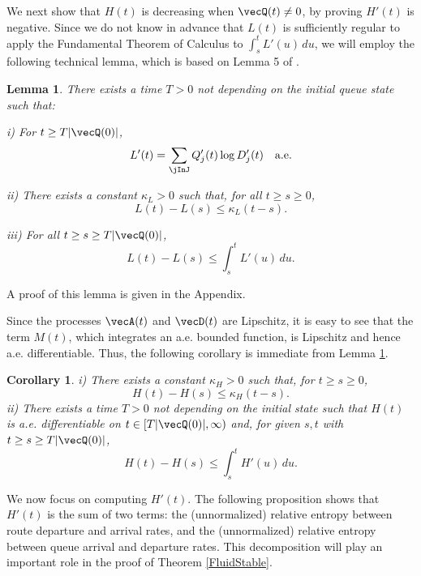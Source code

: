 \documentclass{amsart}
\newtheorem{corollary}{Corollary}
\newtheorem{lemma}{Lemma}
\begin{document}
We next show that  $H(t)$ is decreasing when $\vecQ(t)\not=0$, by proving $H'(t)$ is negative.
Since we do not know in advance that $L(t)$ is sufficiently regular to
apply the Fundamental Theorem of Calculus to
$\int_s^t L'(u)\,du$, we will employ the following
technical lemma, which is based on Lemma 5 of \cite{Ma07}.

\begin{lemma}\label{L.deriv.a.e.} 
There exists a time $T>0$ not depending on the initial queue state such that:

i) For $t \geq T|\vecQ(0)|$, 
\begin{equation}\label{eq:EnvelopeTheorem}
L'(t) = 
\sum_\jInJ Q'_j(t) \log D'_j(t) \quad \text{a.e.}
\end{equation}

ii) There exists a constant $\kappa_L>0$ such that, for all $t\geq s \geq 0$,  
\begin{equation}\label{eq:L.Lipschitz.up}
L(t)-L(s) \leq \kappa_L (t-s).
\end{equation}

iii) For all $t\geq s\geq T|\vecQ(0)|$,
\begin{equation*}
L(t) - L(s) \leq \int_s^t L'(u) \, du.
\end{equation*}
\end{lemma}
A proof of this lemma is given in the Appendix. 

Since the processes $\vecA(t)$ and $\vecD(t)$ are Lipschitz, it is easy to see that the term $M(t)$, which integrates an a.e. bounded function, is Lipschitz and hence a.e. differentiable.  
Thus, the following corollary is immediate from Lemma \ref{L.deriv.a.e.}.

\begin{corollary}\label{H.deriv.a.e.} 
i) There exists a constant $\kappa_H>0$ such that, for $t\geq s \geq 0$,  
\begin{equation}\label{eq:H.Lipschitz.up}
H(t)-H(s) \leq \kappa_H (t-s).
\end{equation}
ii) There exists a time $T>0$ not depending on the initial state such that $H(t)$ is a.e. differentiable on $t \in [T|\vecQ(0)|, \infty)$ and, for given $s,t$ with $t\ge s\ge T|\vecQ(0)|$,
\begin{equation}\label{eq:upp.Lipschitz}
H(t) - H(s) \leq \int_s^t H'(u) \, du.
\end{equation}
\end{corollary}

 We now focus on computing $H'(t)$. The following proposition shows that  $H'(t)$ is the sum of two terms: the (unnormalized) relative entropy between route departure and arrival rates, and the (unnormalized) relative entropy between queue arrival and departure rates. This decomposition will play an important role in the proof of Theorem \ref{FluidStable}.  
\end{document}
